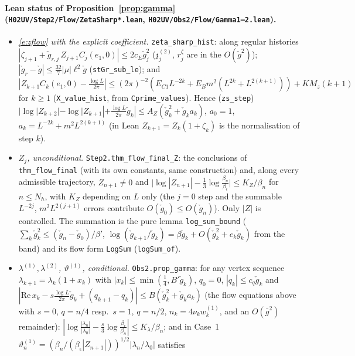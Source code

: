 \documentclass[11pt]{amsart}
\theoremstyle{definition}
\theoremstyle{remark}
\numberwithin{equation}{section}
\begin{document}
\paragraph{Lean status of Proposition~\ref{prop:gamma} (\texttt{H02UV/Step2/Flow/ZetaSharp*.lean}, \texttt{H02UV/Obs2/Flow/Gamma1--2.lean}).}
\begin{itemize}
\item \emph{\eqref{e:zflow} with the explicit coefficient.} \texttt{zeta\_sharp\_hist}: along regular histories
  $|\zeta_{j+1}+\check g_{r,j}\,Z_{j+1}C_j(e_1,0)|\le 2c_E\check g_j^2$ ($\mathfrak z^{(2)}_j$, $r^\zeta_j$ are in the
  $O(\check g^2)$); $|\check g_r-\check g|\le\frac{32}7|\mu|\ell^2\check g$ (\texttt{stGr\_sub\_le}); and
  $|Z_{k+1}C_k(e_1,0)-\frac{\log L}{2\pi}|\le(2\pi)^{-2}(E_{C1}L^{-2k}+E_Bm^2(L^{2k}+L^{2(k+1)}))+KM_z(k+1)$ for
  $k\ge1$ (\texttt{X\_value\_hist}, from \texttt{Cprime\_values}). Hence (\texttt{zs\_step})
  $|\log|Z_{k+2}|-\log|Z_{k+1}|+\frac{\log L}{2\pi}\check g_k|\le A_Z(\check g_k^2+\check g_ka_k)$, $a_0=1$,
  $a_k=L^{-2k}+m^2L^{2(k+1)}$ (in Lean $Z_{k+1}=Z_k(1+\zeta_k)$ is the normalisation of step $k$).
\item \emph{$Z_j$, unconditional.} \texttt{Step2.thm\_flow\_final\_Z}: the conclusions of
  \texttt{thm\_flow\_final} (with its own constants, same construction) and, along every admissible
  trajectory, $Z_{n+1}\ne0$ and $\bigl|\log|Z_{n+1}|-\frac13\log\frac{\beta_n}{\beta_\epsilon}\bigr|\le K_Z/\beta_n$ for
  $n\le N_h$, with $K_Z$ depending on $L$ only (the $j=0$ step and the summable $L^{-2j}$, $m^2L^{2(j+1)}$
  errors contribute $O(\check g_0)\le O(\check g_n)$). Only $|Z|$ is controlled. The summation is the pure
  lemma \texttt{log\_sum\_bound} ($\sum_k\check g_k^2\le(\check g_n-\check g_0)/\beta'$, $\log(\check g_{k+1}/\check g_k)
  =\beta\check g_k+O(\check g_k^2+e_k\check g_k)$ from the band) and its flow form \texttt{LogSum}
  (\texttt{logSum\_of}).
\item \emph{$\lambda^{(1)},\lambda^{(2)}$, $\vartheta^{(1)}$, conditional.} \texttt{Obs2.prop\_gamma}: for any vertex sequence
  $\lambda_{k+1}=\lambda_k(1+x_k)$ with $|x_k|\le\min(\frac14,B'\check g_k)$, $q_0=0$, $|q_k|\le c_q\check g_k$ and
  $|\mathrm{Re}\,x_k-s\frac{\log L}{2\pi}\check g_k+(q_{k+1}-q_k)|\le B(\check g_k^2+\check g_ka_k)$ (the flow equations
  above with $s=0$, $q=n/4$ resp.\ $s=1$, $q=n/2$, $n_k=4\nu_kw^{(1)}_k$, and an $O(\bar g^2)$ remainder):
  $|\log\frac{|\lambda_n|}{|\lambda_0|}-\frac s3\log\frac{\beta_\epsilon}{\beta_n}|\le K_\lambda/\beta_n$; and in Case~1
  $\vartheta^{(1)}_n=(\beta_n/(\beta_\epsilon|Z_{n+1}|))^{1/2}|\lambda_n/\lambda_0|$ satisfies

\end{itemize}
\end{document}
